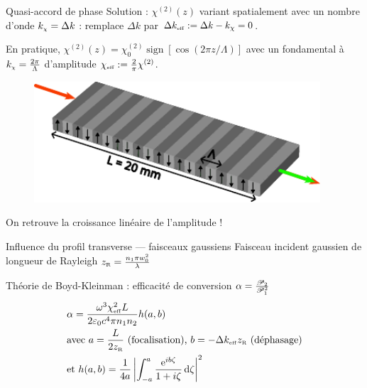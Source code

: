 \documentclass{beamer}
\newcommand{\zr}{z_\mathsc{R}}
\newcommand{\chie}{\chi_\mathsc{eff}}
\newcommand{\dke}{\Delta k_\mathsc{eff}}
\begin{document}
\begin{frame}{Quasi-accord de phase}
Solution : $\chi^{(2)}(z)$ variant spatialement avec un nombre d'onde $k_\mathsc{\chi} = \Delta k$ : remplace $\Delta k$ par $\dke := \Delta k - k_\chi = 0$.
\pause

En pratique, $\chi^{(2)}(z) = \chi^{(2)}_0 \operatorname{sign}[\cos(2\pi z/ \Lambda)]$ avec un fondamental à $k_\mathsc\chi = \frac{2\pi}{\Lambda}$ d'amplitude $\chie := \frac2\pi \chi^{(2)}$.

\begin{figure}
\centering
\includegraphics[height=4.5cm]{./img/PP.pdf}
\end{figure}




\end{frame}

\begin{frame}
\centering

\begin{beamerboxesrounded}[width=0.8\textwidth]{}
On retrouve la croissance linéaire de l'amplitude !
\end{beamerboxesrounded}
\end{frame}


\begin{frame}{Influence du profil transverse --- faisceaux gaussiens}
Faisceau incident gaussien de longueur de Rayleigh $\zr = \frac{n_1\pi w_0^2}{\lambda}$

Théorie de Boyd-Kleinman : efficacité de conversion $\alpha = \frac{\P_2}{\P_1^2}$
\begin{align*}
&\alpha = \frac{\omega^3 \chie^2 L}{2 \varepsilon_0 c^4 \pi n_1 n_2} h(a,b) \\
	&\text{avec } a=\frac{L}{2z_{\mathsc R}}\text{ (focalisation), } b=- \Delta k_\mathsc{eff} z_\mathsc{R} \text{ (déphasage)} \\
	&\text{et } h(a,b)=\frac{1}{4a} \left|\int_{-a}^{a} \frac{\e{ib\zeta}}{1+i\zeta} \diff \zeta \right|^2
\end{align*}
\end{frame}
\end{document}
